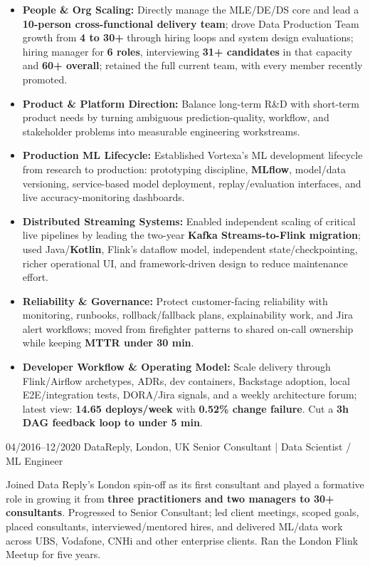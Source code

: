 \documentclass[]{../../../../friggeri-cv}
\begin{document}
\begin{entrylist}
{{    	}
	    \begin{itemize}[leftmargin=1.1em]
										        \item \footnotesize\textbf{People \& Org Scaling:} Directly manage the MLE/DE/DS core and lead a \textbf{10-person cross-functional delivery team}; drove Data Production Team growth from \textbf{4 to 30+} through hiring loops and system design evaluations; hiring manager for \textbf{6 roles}, interviewing \textbf{31+ candidates} in that capacity and \textbf{60+ overall}; retained the full current team, with every member recently promoted.
										        \item \footnotesize\textbf{Product \& Platform Direction:} Balance long-term R\&D with short-term product needs by turning ambiguous prediction-quality, workflow, and stakeholder problems into measurable engineering workstreams.
										        \item \footnotesize\textbf{Production ML Lifecycle:} Established Vortexa's ML development lifecycle from research to production: prototyping discipline, \textbf{MLflow}, model/data versioning, service-based model deployment, replay/evaluation interfaces, and live accuracy-monitoring dashboards.
										        \item \footnotesize\textbf{Distributed Streaming Systems:} Enabled independent scaling of critical live pipelines by leading the two-year \textbf{Kafka Streams-to-Flink migration}; used Java/\textbf{Kotlin}, Flink's dataflow model, independent state/checkpointing, richer operational UI, and framework-driven design to reduce maintenance effort.
										        \item \footnotesize\textbf{Reliability \& Governance:} Protect customer-facing reliability with monitoring, runbooks, rollback/fallback plans, explainability work, and Jira alert workflows; moved from firefighter patterns to shared on-call ownership while keeping \textbf{MTTR under 30 min}.
										        \item \footnotesize\textbf{Developer Workflow \& Operating Model:} Scale delivery through Flink/Airflow archetypes, ADRs, dev containers, Backstage adoption, local E2E/integration tests, DORA/Jira signals, and a weekly architecture forum; latest view: \textbf{14.65 deploys/week} with \textbf{0.52\% change failure}. Cut a \textbf{3h DAG feedback loop to under 5 min}.
    	\end{itemize}
	}
    \entry
    {04/2016–12/2020}
    {DataReply, London, UK}
    {Senior Consultant | Data Scientist / ML Engineer}
    {
        {\small
        \setlength{\parindent}{0pt}
        \setlength{\leftskip}{0pt}
					        Joined Data Reply's London spin-off as its first consultant and played a formative role in growing it from \textbf{three practitioners and two managers to 30+ consultants}. Progressed to Senior Consultant; led client meetings, scoped goals, placed consultants, interviewed/mentored hires, and delivered ML/data work across UBS, Vodafone, CNHi and other enterprise clients. Ran the London Flink Meetup for five years.

}}
\end{entrylist}
\end{document}
